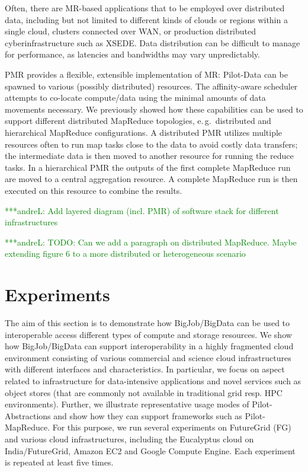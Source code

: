 \documentclass[times]{cpeauth}
\newcommand{\alnote}[1]{ {\textcolor{green} { ***andreL: #1 }}}
\newcommand{\alnote}[1]{}
\newcommand{\pilot}{Pilot\xspace}
\newcommand{\pilotdata}{Pilot-Data\xspace}
\begin{document}
Often, there are MR-based applications that to be employed over distributed
data, including but not limited to different kinds of clouds or regions within
a single cloud, clusters connected over WAN, or production distributed
cyberinfrastructure such as XSEDE. Data distribution can be difficult to
manage for performance, as latencies and bandwidths may vary unpredictably.

PMR provides a flexible, extensible implementation of MR: \pilotdata can be
spawned to various (possibly distributed) resources. The affinity-aware
scheduler attempts to co-locate compute/data using the minimal amounts of data
movements necessary. We previously showed how these capabilities can be used
to support different distributed MapReduce topologies, e.\,g.\ distributed and
hierarchical MapReduce configurations. A distributed PMR utilizes multiple
resources often to run map tasks close to the data to avoid costly data
transfers; the intermediate data is then moved to another resource for running
the reduce tasks. In a hierarchical PMR the outputs of the first complete
MapReduce run are moved to a central aggregation resource. A complete
MapReduce run is then executed on this resource to combine the results.
 






\alnote{Add layered diagram (incl. PMR) of software stack for different 
infrastructures}

\alnote{TODO: Can we add a paragraph on distributed MapReduce. Maybe extending 
figure 6 to a more distributed or heterogeneous scenario}


\section{Experiments}

The aim of this section is to demonstrate how BigJob/BigData can be used to
interoperable access different types of compute and storage resources. We show
how BigJob/BigData can support interoperability in a highly fragmented cloud
environment consisting of various commercial and science cloud infrastructures
with different interfaces and characteristics. In particular, we focus on
aspect related to infrastructure for data-intensive applications and novel
services such as object stores (that are commonly not available in traditional
grid resp. HPC environments). Further, we illustrate representative usage
modes of \pilot-Abstractions and show how they can support
frameworks such as Pilot-MapReduce. For this purpose, we run several
experiments on FutureGrid (FG) and various cloud infrastructures, including
the Eucalyptus cloud on India/FutureGrid, Amazon EC2 and Google Compute
Engine. Each experiment is repeated at least five times.
\end{document}
